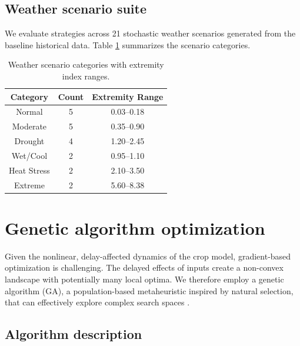 \documentclass[preprint,12pt]{elsarticle}
\begin{document}
\subsection{Weather scenario suite}\label{subsec:weather-scenarios}

We evaluate strategies across 21 stochastic weather scenarios generated from the baseline historical data. Table \ref{tab:scenario-categories} summarizes the scenario categories.

\begin{table}[ht]
\centering
\begin{tabular}{|c|c|c|}
\hline
Category    & Count & Extremity Range \\
\hline\hline
Normal      & 5     & 0.03--0.18      \\
Moderate    & 5     & 0.35--0.90      \\
Drought     & 4     & 1.20--2.45      \\
Wet/Cool    & 2     & 0.95--1.10      \\
Heat Stress & 2     & 2.10--3.50      \\
Extreme     & 2     & 5.60--8.38      \\
\hline
\end{tabular}
\caption{Weather scenario categories with extremity index ranges.}
\label{tab:scenario-categories}
\end{table}

\section{Genetic algorithm optimization}\label{sec:ga}

Given the nonlinear, delay-affected dynamics of the crop model, gradient-based optimization is challenging. The delayed effects of inputs create a non-convex landscape with potentially many local optima. We therefore employ a genetic algorithm (GA), a population-based metaheuristic inspired by natural selection, that can effectively explore complex search spaces \cite{goldberg1989ga}.

\subsection{Algorithm description}\label{subsec:ga-alg}
\end{document}

